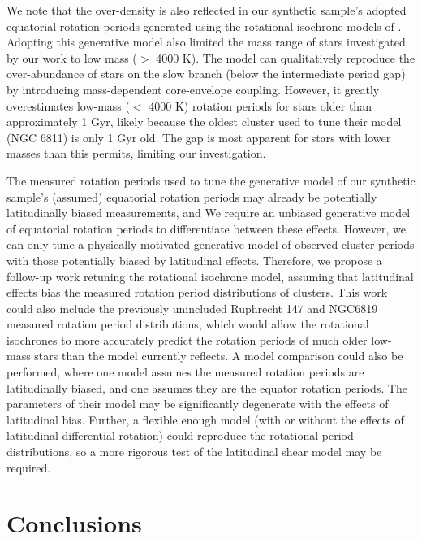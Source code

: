 We note that the over-density is also reflected in our synthetic sample's adopted equatorial rotation periods generated using the rotational isochrone models of \citet{spada_competing_2020}.
Adopting this generative model also limited the mass range of stars investigated by our work to low mass ($>$ 4000 K).
The model can qualitatively reproduce the over-abundance of stars on the slow branch (below the intermediate period gap) by introducing mass-dependent core-envelope coupling.
However, it greatly overestimates low-mass ($<$ 4000 K) rotation periods for stars older than approximately 1 Gyr, likely because the oldest cluster used to tune their model (NGC 6811) is only 1 Gyr old. 
The gap is most apparent for stars with lower masses than this permits, limiting our investigation.

The measured rotation periods used to tune the generative model of our synthetic sample's (assumed) equatorial rotation periods may already be potentially latitudinally biased measurements, and 
We require an unbiased generative model of equatorial rotation periods to differentiate between these effects.
However, we can only tune a physically motivated generative model of observed cluster periods with those potentially biased by latitudinal effects.
Therefore, we propose a follow-up work retuning the rotational isochrone model, assuming that latitudinal effects bias the measured rotation period distributions of clusters.
This work could also include the previously unincluded Ruphrecht 147 \citep{curtis_when_2020} and NGC6819 \citep{meibom_kepler_2011} measured rotation period distributions, which would allow the rotational isochrones to more accurately predict the rotation periods of much older low-mass stars than the model currently reflects.
A model comparison could also be performed, where one model assumes the measured rotation periods are latitudinally biased, and one assumes they are the equator rotation periods.
The parameters of their model may be significantly degenerate with the effects of latitudinal bias.
Further, a flexible enough model (with or without the effects of latitudinal differential rotation) could reproduce the rotational period distributions, so a more rigorous test of the latitudinal shear model may be required.


\section{Conclusions}
\label{sec:conclusione}

